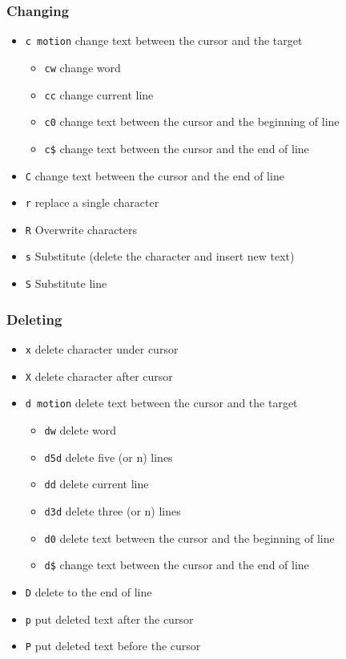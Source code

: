 \documentclass{beamer}
\begin{document}
\begin{frame}
\frametitle{Changing}
\begin{itemize}

\item \texttt{c motion} change text between the cursor and the target
\begin{itemize}
\item \texttt{cw} change word
\item \texttt{cc} change current line 
\item \texttt{c0} change text between the cursor and the beginning of line
\item \texttt{c\$} change text between the cursor and the end of line
\end{itemize}

\item \texttt{C} change text between the cursor and the end of line
\item \texttt{r} replace a single character
\item \texttt{R} Overwrite characters
\item \texttt{s} Substitute (delete the character and insert new text)
\item \texttt{S} Substitute line
\end{itemize}

\end{frame}


\begin{frame}
\frametitle{Deleting}
\begin{itemize}

\item \texttt{x} delete character under cursor
\item \texttt{X} delete character after cursor
\item \texttt{d motion} delete text between the cursor and the target
\begin{itemize}
\item \texttt{dw} delete word
\item \texttt{d5d} delete five (or n) lines
\item \texttt{dd} delete current line 
\item \texttt{d3d} delete three (or n) lines
\item \texttt{d0} delete text between the cursor and the beginning of line
\item \texttt{d\$} change text between the cursor and the end of line
\end{itemize}
\item \texttt{D} delete to the end of line
\item \texttt{p} put deleted text after the cursor
\item \texttt{P} put deleted text before the cursor
\end{itemize}

\end{frame}
\end{document}
